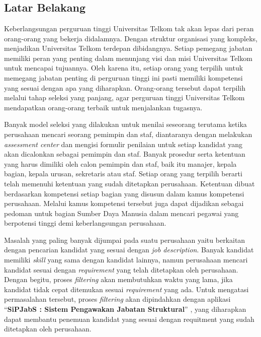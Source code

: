 \chapter{\babSatu}
\section{Latar Belakang}
Keberlangsungan perguruan tinggi Universitas Telkom tak akan lepas dari peran orang-orang yang bekerja didalamnya. Dengan struktur organisasi yang kompleks, menjadikan Universitas Telkom terdepan dibidangnya. Setiap pemegang jabatan memiliki peran yang penting dalam menunjang visi dan misi Universitas Telkom untuk mencapai tujuannya. Oleh karena itu, setiap orang yang terpilih untuk memegang jabatan penting di perguruan tinggi ini pasti memiliki kompetensi yang sesuai dengan apa yang diharapkan. Orang-orang tersebut dapat terpilih melalui tahap seleksi yang panjang, agar perguruan tinggi Universitas Telkom mendapatkan orang-orang terbaik untuk menjalankan tugasnya.

Banyak model seleksi yang dilakukan untuk menilai seseorang terutama ketika perusahaan mencari seorang pemimpin dan staf, diantaranya dengan melakukan \textit{assessment center} dan mengisi formulir penilaian untuk setiap kandidat yang akan dicalonkan sebagai pemimpin dan staf. Banyak prosedur serta ketentuan yang harus dimiliki oleh calon pemimpin dan staf, baik itu manajer, kepala bagian, kepala urusan, sekretaris atau staf. Setiap orang yang terpilih berarti telah memenuhi ketentuan yang sudah ditetapkan perusahaan. Ketentuan dibuat berdasarkan kompetensi setiap bagian yang disusun dalam kamus kompetensi perusahaan. Melalui kamus kompetensi tersebut juga dapat dijadikan sebagai pedoman untuk bagian Sumber Daya Manusia dalam mencari pegawai yang berpotensi tinggi demi keberlangsungan perusahaan.

Masalah yang paling banyak dijumpai pada suatu perusahaan yaitu berkaitan dengan pencarian kandidat yang sesuai dengan \textit{job description}. Banyak kandidat memiliki \textit{skill} yang sama dengan kandidat lainnya, namun perusahaan mencari kandidat sesuai dengan \textit{requirement} yang telah ditetapkan oleh perusahaan. Dengan begitu, proses \textit{filtering} akan membutuhkan waktu yang lama, jika kandidat tidak cepat ditemukan sesuai \textit{requirement} yang ada. Untuk mengatasi permasalahan tersebut, proses \textit{filtering} akan dipindahkan dengan aplikasi “\textbf{SiPJabS : Sistem Pengawakan Jabatan Struktural}” , yang diharapkan dapat membantu penemuan kandidat yang sesuai dengan requitment yang sudah ditetapkan oleh perusahaan.
\\

